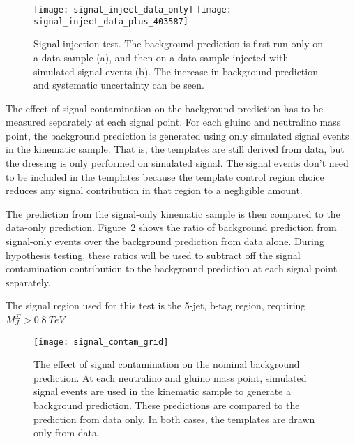 \begin{figure}[!ht]
    \texttt{[image: signal\_inject\_data\_only]}
    \texttt{[image: signal\_inject\_data\_plus\_403587]}
    \caption{Signal injection test.
    The background prediction is first run only on a data sample (a), and then on a data sample injected with simulated signal events (b).
    The increase in background prediction and systematic uncertainty can be seen.}
    \label{fig:signal_inject_403587}
\end{figure}

The effect of signal contamination on the background prediction has to be measured separately at each signal point.
For each gluino and neutralino mass point, the background prediction is generated using only simulated signal events in the kinematic sample.
That is, the templates are still derived from data, but the dressing is only performed on simulated signal.
The signal events don't need to be included in the templates because the template control region choice reduces any signal contribution in that region to a negligible amount.

The prediction from the signal-only kinematic sample is then compared to the data-only prediction.
Figure~\ref{fig:signal_contam_grid} shows the ratio of background prediction from signal-only events over the background prediction from data alone.
During hypothesis testing, these ratios will be used to subtract off the signal contamination contribution to the background prediction at each signal point separately.

The signal region used for this test is the 5-jet, b-tag region,
requiring $M_J^{\Sigma}>0.8~TeV$.

\begin{figure}[!ht]
    \texttt{[image: signal\_contam\_grid]}
    \caption{The effect of signal contamination on the nominal background prediction.
    At each neutralino and gluino mass point, simulated signal events are used in the kinematic sample to generate a background prediction.
    These predictions are compared to the prediction from data only.
    In both cases, the templates are drawn only from data.}
    \label{fig:signal_contam_grid}
\end{figure}
